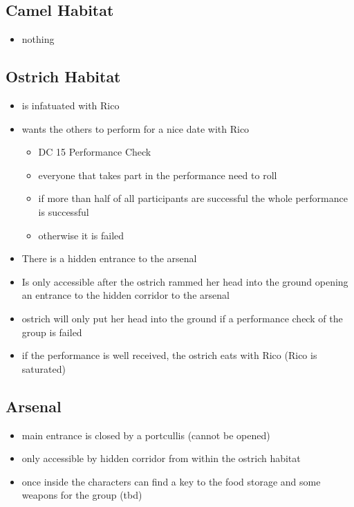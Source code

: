 \subsection*{ Camel Habitat}
\begin{itemize}
	\item nothing
\end{itemize}
\subsection*{ Ostrich Habitat}
\begin{itemize}
	\item is infatuated with Rico
	\item wants the others to perform for a nice date with Rico
	\begin{itemize}
		\item DC 15 Performance Check
		\item everyone that takes part in the performance need to roll
		\item if more than half of all participants are successful the whole performance is successful
		\item otherwise it is failed
	\end{itemize}
	\item There is a hidden entrance to the arsenal
	\item Is only accessible after the ostrich rammed her head into the ground opening an entrance to the hidden corridor to the arsenal
	\item ostrich will only put her head into the ground if a performance check of the group is failed
	\item if the performance is well received, the ostrich eats with Rico (Rico is saturated)
\end{itemize}
\subsection*{ Arsenal}
\begin{itemize}
	\item main entrance is closed by a portcullis (cannot be opened)
	\item only accessible by hidden corridor from within the ostrich habitat
	\item once inside the characters can find a key to the food storage and some weapons for the group (tbd)
\end{itemize}
